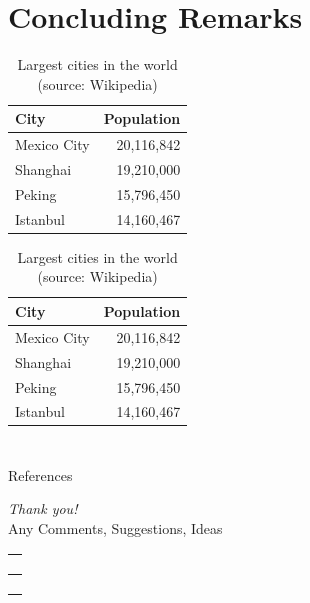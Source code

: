\documentclass[
11pt,notheorems,compress,hyperref={pdfauthor=Maghfira Ramadhani}
]{beamer}
\begin{document}
\section{Concluding Remarks}
\begin{frame}
    \begin{table}
        \caption{Largest cities in the world (source: Wikipedia)}
        \begin{tabular}{@{} lr @{}}
          \toprule
          City & Population\\
          \midrule
          Mexico City & 20,116,842\\
          Shanghai & 19,210,000\\
          Peking & 15,796,450\\
          Istanbul & 14,160,467\\
          \bottomrule
        \end{tabular}
        \hspace*{1cm}
            \setlength\extrarowheight{3pt}
        \begin{tabular}{|lr|}
          \hline
          \rowcolor{primary}\color{white}City & \color{white}Population\\
          \hline
          Mexico City & 20,116,842\\
          Shanghai & 19,210,000\\
          Peking & 15,796,450\\
          Istanbul & 14,160,467\\
          \hline
        \end{tabular}
    \end{table}
\end{frame}

\section{}
\begin{frame}[allowframebreaks]{References}
    
    
\end{frame}

\begin{frame}{}
  \centering
  {\LARGE\emph{Thank you!}}\\
  \vspace{1cm}
  Any Comments, Suggestions, Ideas\\
  \href{mailto:\maghfira.ramadhani@gatech.edu}{\faEnvelope\ \  }\\
  \href{http://maghfiraer.github.io}{\faHome\ \  } \\
  \href{https://github.com/maghfiraer/ECON7023-Metrics-II/tree/main/Final_Project}{\faGithubSquare\ \  }
\end{frame}
\end{document}
